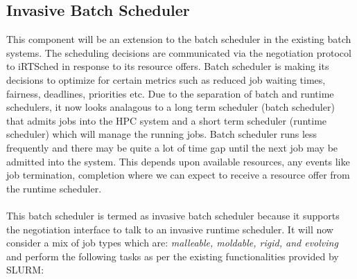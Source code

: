 \subsection{Invasive Batch Scheduler}
This component will be an extension to the batch scheduler in the existing batch systems. The scheduling decisions are communicated via the negotiation protocol to iRTSched in response to its resource offers. Batch scheduler is making its decisions to optimize for certain metrics such as reduced job waiting times, fairness, deadlines, priorities etc. Due to the separation of batch and runtime schedulers, it now looks analagous to a long term scheduler (batch scheduler) that admits jobs into the HPC system and a short term scheduler (runtime scheduler) which will manage the running jobs. Batch scheduler runs less frequently and there may be quite a lot of time gap until the next job may be admitted into the system. This depends upon available resources, any events like job termination, completion where we can expect to receive a resource offer from the runtime scheduler.\\ \\
This batch scheduler is termed as invasive batch scheduler because it supports the negotiation interface to talk to an invasive runtime scheduler. It will now consider a mix of job types which are: \textit{malleable, moldable, rigid, and evolving} and perform the following tasks as per the existing functionalities provided by SLURM:
